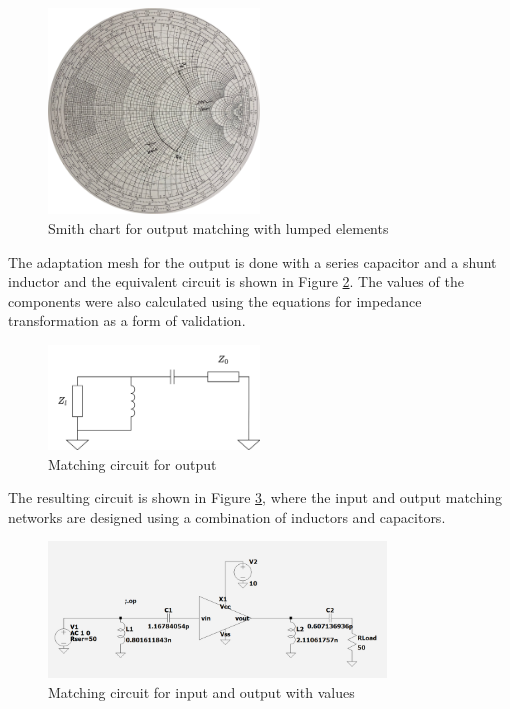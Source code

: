 \begin{figure}[H]
    \centering
    \includegraphics[width=0.5\textwidth]{Images/zl-LC-matching.png}
    \caption{Smith chart for output matching with lumped elements}
    \label{fig:zl-LC-matching}
\end{figure}

The adaptation mesh for the output is done with a series capacitor and a shunt inductor and the equivalent circuit is shown in Figure \ref{fig:MatchingCircuit-output}. The values of the components were also calculated using the equations for impedance transformation as a form of validation.

\begin{figure}[H]
    \centering
    \includegraphics[width=0.5\textwidth]{Images/Ouput-matching-circuit.png}
    \caption{Matching circuit for output}
    \label{fig:MatchingCircuit-output} 
\end{figure}

The resulting circuit is shown in Figure \ref{fig:MatchingCircuit}, where the input and output matching networks are designed using a combination of inductors and capacitors.

\begin{figure}[H]
    \centering
    \includegraphics[width=0.8\textwidth]{Images/LC_matching-circuit.png}
    \caption{Matching circuit for input and output with values}
    \label{fig:MatchingCircuit}
\end{figure}

